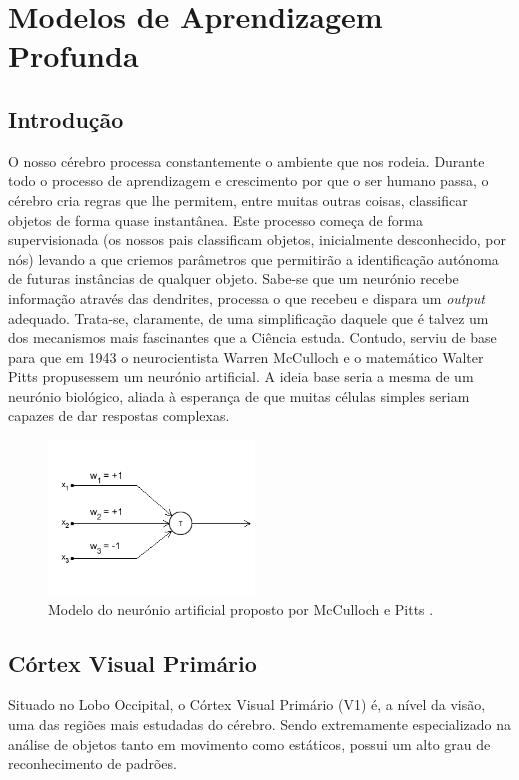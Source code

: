 \chapter{Modelos de Aprendizagem Profunda}
\label{chap:redes-neuronais-convolucionais}

\section{Introdução}
\label{chap2:sec:intro}
O nosso cérebro processa constantemente o ambiente que nos rodeia. Durante todo o processo de aprendizagem e crescimento por que o ser humano passa, o cérebro cria regras que lhe permitem, entre muitas outras coisas, classificar objetos de forma quase instantânea. Este processo começa de forma supervisionada (os nossos pais classificam objetos, inicialmente desconhecido, por nós) levando a que criemos parâmetros que permitirão a identificação autónoma de futuras instâncias de qualquer objeto.\newline
\noindent 
\newline
\noindent Sabe-se que um neurónio recebe informação através das dendrites, processa o que recebeu e dispara um \textit{output} adequado. Trata-se, claramente, de uma simplificação daquele que é talvez um dos mecanismos mais fascinantes que a Ciência estuda. Contudo, serviu de base para que em 1943 o neurocientista  Warren McCulloch e o matemático Walter Pitts propusessem um neurónio artificial. A ideia base seria a mesma de um neurónio biológico, aliada à esperança de que muitas células simples seriam capazes de dar respostas complexas. 

\begin{figure}[h]
\centering
\includegraphics[width=155pt]{mp_neuron.png}
\caption{Modelo do neurónio artificial proposto por McCulloch e Pitts \cite{neuron_site}.}
\label{fig:mp_neuron}
\end{figure}

\section{Córtex Visual Primário}
\label{chap2:sec:cortex_visual}
Situado no Lobo Occipital, o Córtex Visual Primário (V1) é, a nível da visão, uma das regiões mais estudadas do cérebro. Sendo extremamente especializado na análise de objetos tanto em movimento como estáticos, possui um alto grau de reconhecimento de padrões.


